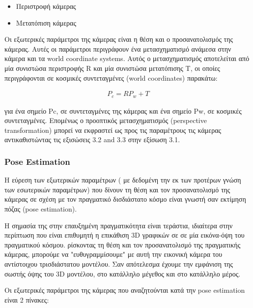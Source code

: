 \begin{itemize}
\item Περιστροφή κάμερας
\item Μετατόπιση κάμερας
\end{itemize}



Οι εξωτερικές παράμετροι της κάμερας είναι η θέση και ο προσανατολισμός της κάμερας. Αυτές οι παράμετροι περιγράφουν ένα μετασχηματισμό ανάμεσα στην κάμερα και τα world coordinate systems.
Αυτός ο μετασχηματισμός αποτελείται από μία συνιστώσα περιστροφής R και μία συνιστώσα μετατόπισης T, οι οποίες περιγράφονται σε κοσμικές συντεταγμένες (world coordinates) παρακάτω:

\begin{equation}
\begin{aligned}
P_{c} = RP_{w}+T
\end{aligned}
\end{equation}

για ένα σημείο Pc, σε συντεταγμένες της κάμερας και ένα σημείο Pw, σε κοσμικές συντεταγμένες. Επομένως ο προοπτικός μετασχηματισμός (perspective transformation) μπορεί να εκφραστεί ως προς τις παραμέτρους τις κάμερας αντικαθιστώντας τις εξισώσεις 3.2 and 3.3 στην εξίσωση 3.1. 










\subsubsection{Pose Estimation}
Η εύρεση των εξωτερικών παραμέτρων ( με δεδομένη την εκ των προτέρων γνώση των εσωτερικών παραμέτρων) που δίνουν τη θέση και τον προσανατολισμό της κάμερας σε σχέση με τον πραγματικό δισδιάστατο κόσμο είναι γνωστή σαν εκτίμηση πόζας (pose estimation).

H σημασία της στην επαυξημένη πραγματικότητα είναι τεράστια, ιδιαίτερα στην περίπτωση που είναι επιθυμητή η επικάθιση 3D γραφικών σε σε μία εικόνα-όψη του πραγματικού κόσμου. ρίσκοντας τη θέση και τον προσανατολισμό της πραγματικής κάμερας, μπορούμε να "ευθυγραμμίσουμε" με αυτή την εικονική κάμερα του αντίστοιχου τρισδιάστατου μοντέλου. Σαν απότελεσμα έχουμε την εμφάνιση της σωστής όψης του 3D μοντέλου, στο κατάλληλο μέγεθος και στο κατάλληλο μέρος.

Οι εξωτερικές παράμετροι της κάμερας που αναζητούνται κατά την pose estimation είναι 2 πίνακες:

